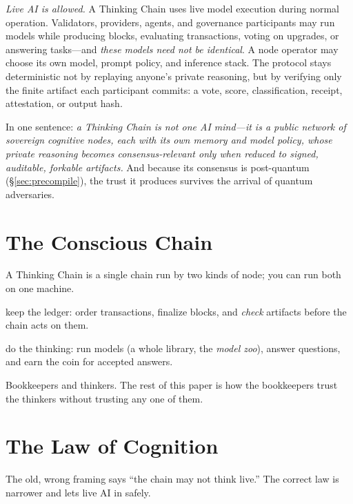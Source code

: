 \documentclass[11pt]{article}
\begin{document}
\medskip\noindent\emph{Live AI is allowed.} A Thinking Chain uses live model execution during normal operation. Validators, providers, agents, and governance participants may run models while producing blocks, evaluating transactions, voting on upgrades, or answering tasks---and \emph{these models need not be identical}. A node operator may choose its own model, prompt policy, and inference stack. The protocol stays deterministic not by replaying anyone's private reasoning, but by verifying only the finite artifact each participant commits: a vote, score, classification, receipt, attestation, or output hash.

\medskip\noindent In one sentence: \emph{a Thinking Chain is not one AI mind---it is a public network of sovereign cognitive nodes, each with its own memory and model policy, whose private reasoning becomes consensus-relevant only when reduced to signed, auditable, forkable artifacts.} And because its consensus is post-quantum (\S\ref{sec:precompile}), the trust it produces survives the arrival of quantum adversaries.

\section{The Conscious Chain}

A Thinking Chain is a single chain run by two kinds of node; you can run both on one machine.
\begin{description}[leftmargin=1.2em,style=nextline]
\item[Consensus nodes] keep the ledger: order transactions, finalize blocks, and \emph{check} artifacts before the chain acts on them.
\item[Cognitive nodes] do the thinking: run models (a whole library, the \emph{model zoo}), answer questions, and earn the coin for accepted answers.
\end{description}
Bookkeepers and thinkers. The rest of this paper is how the bookkeepers trust the thinkers without trusting any one of them.

\section{The Law of Cognition}

The old, wrong framing says ``the chain may not think live.'' The correct law is narrower and lets live AI in safely.
\end{document}
